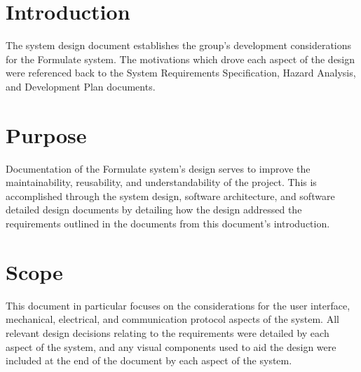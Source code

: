 \documentclass[12pt, titlepage]{article}
\begin{document}
\newpage

\tableofcontents

\newpage

\listoftables

\listoffigures

\newpage


\section{Introduction}

The system design document establishes the group's development considerations for the Formulate system. The motivations which drove each aspect of the design were referenced back to the System Requirements Specification, Hazard Analysis, and Development Plan documents. 


\section{Purpose}



Documentation of the Formulate system's design serves to improve the maintainability, reusability, and understandability of the project. This is accomplished through the system design, software architecture, and software detailed design documents by detailing how the design addressed the requirements outlined in the documents from this document's introduction. \\

\section{Scope}


This document in particular focuses on the considerations for the user interface, mechanical, electrical, and communication protocol aspects of the system. All relevant design decisions relating to the requirements were detailed by each aspect of the system, and any visual components used to aid the design were included at the end of the document by each aspect of the system. \\ 
\end{document}
